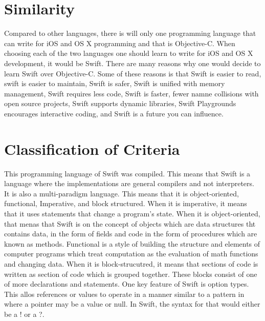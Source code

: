 \documentclass[11pt]{article}
\begin{document}
\vspace*{-.4in}
\section{Similarity}
\label{sec:similarity}
\vspace*{-.1in}

Compared to other languages, there is will only one programming language that can write for iOS and OS X programming and that is Objective-C. When choosing each of the two languages one should learn to write for iOS and OS X development, it would be Swift. There are many reasons why one would decide to learn Swift over Objective-C. Some of these reasons is that Swift is easier to read, swift is easier to maintain, Swift is safer, Swift is unified with memory management, Swift requires less code, Swift is faster, fewer namne collisions with open source projects, Swift supports dynamic libraries, Swift Playgrounds encourages interactive coding, and Swift is a future you can influence.  




\vspace*{-.4in}
\section{Classification of Criteria}
\label{sec:classificartionofcritiera}
\vspace*{-.1in}

This programming language of Swift was compiled. This means that Swift is a language where the implementations are general compilers and not interpreters. It is also a multi-paradigm language. This means that it is object-oriented, functional, Imperative, and block structured. When it is imperative, it means that it uses statements that change a program's state. When it is object-oriented, that menas that Swift is on the concept of objects which are data structures tht contains data, in the form of fields and code in the form of procedures which are known as methods. Functional is a style of building the structure and elements of computer programs which treat computation as the evaluation of math functions and changing data. When it is block-strucutred, it means that sections of code is written as section of code which is grouped together. These blocks consist of one of more declarations and statements.
One key feature of Swift is option types. This allos references or values to operate in a manner similar to a pattern in where a pointer may be a value or null. In Swift, the syntax for that would either be a ! or a ?.
\end{document}
